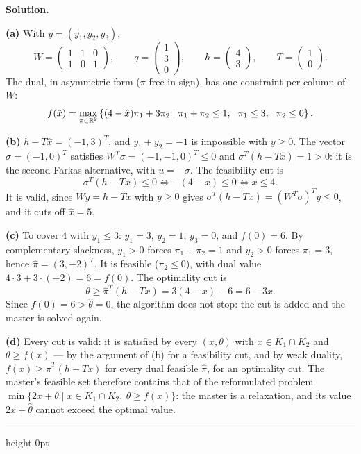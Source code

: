 \documentclass[11pt]{article}
\newenvironment{solution}
    {\par\nobreak\smallskip\noindent\textbf{Solution.}\par\nobreak\smallskip}
    {\par\medskip\hrule height 0pt\medskip}
\begin{document}
\begin{solution}
\textbf{(a)} With $y = (y_1, y_2, y_3)$,
\[
W = \begin{pmatrix} 1 & 1 & 0 \\ 1 & 0 & 1 \end{pmatrix}, \qquad
q = \begin{pmatrix} 1 \\ 3 \\ 0 \end{pmatrix}, \qquad
h = \begin{pmatrix} 4 \\ 3 \end{pmatrix}, \qquad
T = \begin{pmatrix} 1 \\ 0 \end{pmatrix}.
\]
The dual, in asymmetric form ($\pi$ free in sign), has one constraint per column
of $W$:
\[
f(\hat{x}) = \max_{\pi \in {\mathbb{R}}^2} \left\{ (4 - \hat{x})\pi_1 + 3\pi_2 \;\middle|\; \pi_1 + \pi_2 \leq 1,\ \ \pi_1 \leq 3,\ \ \pi_2 \leq 0 \right\}.
\]

\textbf{(b)} $h - T\hat{x} = (-1, 3)^T$, and $y_1 + y_2 = -1$ is impossible with
$y \geq 0$. The vector $\sigma = (-1, 0)^T$ satisfies $W^T\sigma = (-1, -1, 0)^T \leq 0$
and $\sigma^T(h - T\hat{x}) = 1 > 0$: it is the second Farkas alternative, with
$u = -\sigma$. The feasibility cut is
\[
\sigma^T(h - Tx) \leq 0 \iff -(4 - x) \leq 0 \iff x \leq 4 .
\]
It is valid, since $Wy = h - Tx$ with $y \geq 0$ gives
$\sigma^T(h - Tx) = (W^T\sigma)^Ty \leq 0$, and it cuts off $\hat{x} = 5$.

\textbf{(c)} To cover $4$ with $y_1 \leq 3$: $y_1 = 3$, $y_2 = 1$, $y_3 = 0$, and
$f(0) = 6$. By complementary slackness, $y_1 > 0$ forces $\pi_1 + \pi_2 = 1$ and
$y_2 > 0$ forces $\pi_1 = 3$, hence $\hat{\pi} = (3, -2)^T$. It is feasible
($\pi_2 \leq 0$), with dual value $4 \cdot 3 + 3 \cdot (-2) = 6 = f(0)$. The
optimality cut is
\[
\theta \geq \hat{\pi}^T(h - Tx) = 3(4 - x) - 6 = 6 - 3x .
\]
Since $f(0) = 6 > \hat{\theta} = 0$, the algorithm does not stop: the cut is added
and the master is solved again.

\textbf{(d)} Every cut is valid: it is satisfied by every $(x, \theta)$ with
$x \in K_1 \cap K_2$ and $\theta \geq f(x)$ --- by the argument of (b) for a
feasibility cut, and by weak duality, $f(x) \geq \hat{\pi}^T(h - Tx)$ for every
dual feasible $\hat{\pi}$, for an optimality cut. The master's feasible set
therefore contains that of the reformulated problem
$\min\{2x + \theta \mid x \in K_1 \cap K_2,\ \theta \geq f(x)\}$: the master is a
relaxation, and its value $2\hat{x} + \hat{\theta}$ cannot exceed the optimal
value.


\end{solution}
\end{document}
